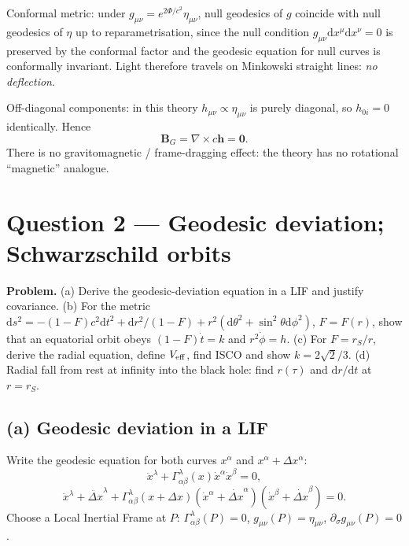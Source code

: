 \documentclass[11pt]{article}
\newcommand{\de}{\mathrm{d}}
\renewcommand{\vb}[1]{\mathbf{#1}}
\begin{document}
Conformal metric: under $g_{\mu\nu}=e^{2\Phi/c^{2}}\eta_{\mu\nu}$, null geodesics of $g$ coincide with null geodesics of $\eta$ up to reparametrisation, since the null condition $g_{\mu\nu}\de x^{\mu}\de x^{\nu}=0$ is preserved by the conformal factor and the geodesic equation for null curves is conformally invariant.  Light therefore travels on Minkowski straight lines: \emph{no deflection}.

Off-diagonal components: in this theory $h_{\mu\nu}\propto\eta_{\mu\nu}$ is purely diagonal, so $h_{0i}=0$ identically.  Hence
\[
\boxed{\;\vb B_{G}=\nabla\times c\vb h=\vb 0.\;}
\]
There is no gravitomagnetic / frame-dragging effect: the theory has no rotational ``magnetic'' analogue.

\section*{Question 2 --- Geodesic deviation; Schwarzschild orbits}

\textbf{Problem.}  (a) Derive the geodesic-deviation equation in a LIF and justify covariance.  (b) For the metric $\de s^{2}=-(1-F)c^{2}\de t^{2}+\de r^{2}/(1-F)+r^{2}(\de\theta^{2}+\sin^{2}\theta\de\phi^{2})$, $F=F(r)$, show that an equatorial orbit obeys $(1-F)\dot t=k$ and $r^{2}\dot\phi=h$.  (c) For $F=r_{S}/r$, derive the radial equation, define $V_{\rm eff}$, find ISCO and show $k=2\sqrt{2}/3$.  (d) Radial fall from rest at infinity into the black hole: find $r(\tau)$ and $\de r/\de t$ at $r=r_{S}$.

\subsection*{(a) Geodesic deviation in a LIF}

Write the geodesic equation for both curves $x^{\alpha}$ and $x^{\alpha}+\Delta x^{\alpha}$:
\[
\ddot x^{\lambda}+\Gamma^{\lambda}_{\alpha\beta}(x)\dot x^{\alpha}\dot x^{\beta}=0,
\]
\[
\ddot x^{\lambda}+\ddot{\Delta x}^{\lambda}+\Gamma^{\lambda}_{\alpha\beta}(x+\Delta x)(\dot x^{\alpha}+\dot{\Delta x}^{\alpha})(\dot x^{\beta}+\dot{\Delta x}^{\beta})=0.
\]
Choose a Local Inertial Frame at $P$: $\Gamma^{\lambda}_{\alpha\beta}(P)=0$, $g_{\mu\nu}(P)=\eta_{\mu\nu}$, $\partial_{\sigma}g_{\mu\nu}(P)=0$.
\end{document}
